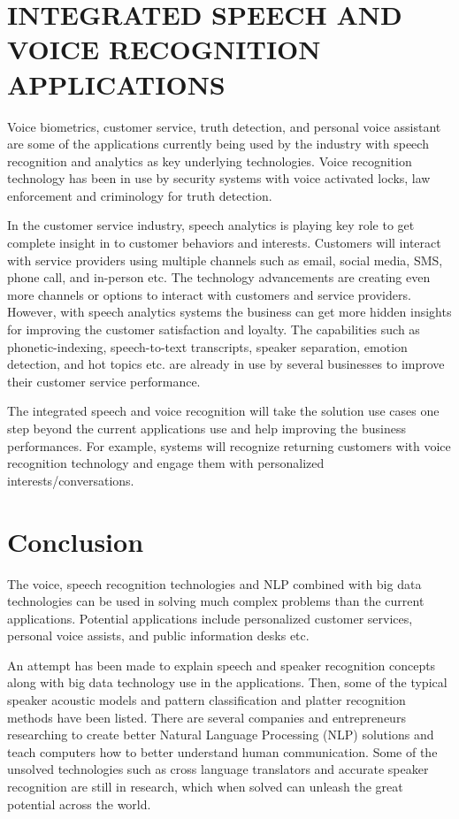 \documentclass[sigconf]{acmart}
\begin{document}
\section{INTEGRATED SPEECH AND VOICE RECOGNITION APPLICATIONS}
Voice biometrics, customer service, truth detection, and personal voice assistant are some of the applications currently being used by the industry with speech recognition and analytics as key underlying technologies. Voice recognition technology has been in use by security systems with voice activated locks, law enforcement and criminology for truth detection. 

In the customer service industry, speech analytics is playing key role to get complete insight in to customer behaviors and interests. Customers will interact with service providers using multiple channels such as email, social media, SMS, phone call, and in-person etc. The technology advancements are creating even more channels or options to interact with customers and service providers.  However, with speech analytics systems the business can get more hidden insights for improving the customer satisfaction and loyalty. The capabilities such as phonetic-indexing, speech-to-text transcripts, speaker separation, emotion detection, and hot topics etc. are already in use by several businesses to improve their customer service performance.

The integrated speech and voice recognition will take the solution use cases one step beyond the current applications use and help improving the business performances. For example, systems will recognize returning customers with voice recognition technology and engage them with personalized interests/conversations. 

\section{Conclusion}
 The voice, speech recognition technologies and NLP combined with big data technologies can be used in solving much complex problems than the current applications. Potential applications include personalized customer services, personal voice assists, and public information desks etc. 
 
 An attempt has been made to explain speech and speaker recognition concepts along with big data technology use in the applications. Then, some of the typical speaker acoustic models and pattern classification and platter recognition methods have been listed. There are several companies and entrepreneurs researching to create better Natural Language Processing (NLP) solutions and teach computers how to better understand human communication. Some of the unsolved technologies such as cross language translators and accurate speaker recognition are still in research, which when solved can unleash the great potential across the world.
\end{document}
